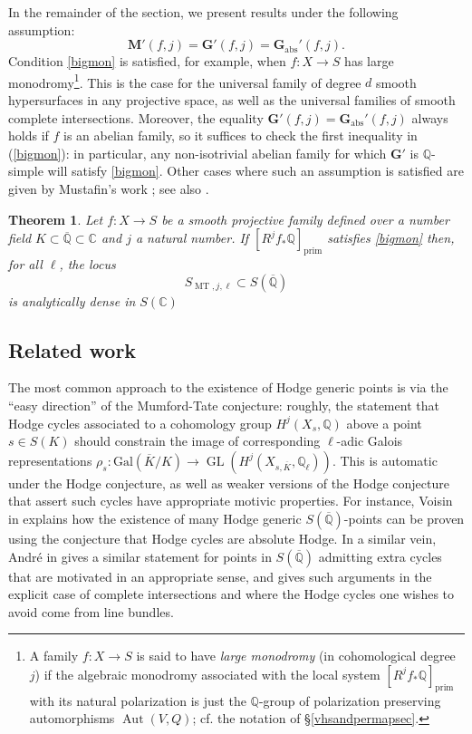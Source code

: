 \documentclass[10pt]{article}
\numberwithin{equation}{section}
\theoremstyle{plain}
\newtheorem{thm}{Theorem}[section]
\theoremstyle{definition}
\theoremstyle{remark}
\newcommand{\GL}{\operatorname{GL}}
\newcommand{\C}{\mathbb{C}}
\newcommand{\Qbar}{\overline{\mathbb{Q}}}
\newcommand{\Q}{\mathbb{Q}}
\begin{document}
In the remainder of the section, we present results under the following assumption: 
\begin{equation}\label{bigmon}
  \mathbf{M}'(f,j) = \mathbf{G}'(f,j) = \mathbf{G}_{\mathrm{abs}}'(f,j)  .
\end{equation}
Condition \eqref{bigmon} is satisfied, for example, when $f:X \to S$ has large monodromy\footnote{A family $f:X \to S$ is said to have \emph{large monodromy} (in cohomological degree $j$) if the algebraic monodromy associated with the local system $[R^{j} f_* \Q]_{\operatorname{prim}}$ with its natural polarization is just the $\mathbb{Q}$-group of polarization preserving automorphisms $\operatorname{Aut}(V,Q)$; cf. the notation of \S\ref{vhsandpermapsec}.}. This is the case for the universal family of degree $d$ smooth hypersurfaces in any projective space, as well as the universal families of smooth complete intersections. Moreover, the equality $\mathbf{G}'(f,j) = \mathbf{G}_{\mathrm{abs}}'(f,j)$ always holds if $f$ is an abelian family, so it suffices to check the first inequality in (\ref{bigmon}): in particular, any non-isotrivial abelian family for which $\mathbf{G}'$ is $\mathbb{Q}$-simple will satisfy \eqref{bigmon}. Other cases where such an assumption is satisfied are given by Mustafin's work \cite{zbMATH04029733}; see also \cite[Ch. IX 3.2]{zbMATH00041964}.


\begin{thm}\label{mainthmonMT}
Let $f : X \to S$ be a smooth projective family defined over a number field $K \subset \Qbar \subset \mathbb{C}$ and $j$ a natural number. If $[R^jf_*\Q]_{\operatorname{prim}}$ satisfies \eqref{bigmon} then, for all $\ell$, the locus
$$S_{\operatorname{MT}, j,\ell}\subset S(\Qbar)$$
is analytically dense in $S(\C)$
\end{thm}



\subsection{Related work}
\label{relworksec}


The most common approach to the existence of Hodge generic points is via the ``easy direction'' of the Mumford-Tate conjecture: roughly, the statement that Hodge cycles associated to a cohomology group $H^{j}(X_{s}, \mathbb{Q})$ above a point $s \in S(K)$ should constrain the image of corresponding $\ell$-adic Galois representations $\rho_{s} : \textrm{Gal}(\overline{K}/K) \to \GL(H^{j}(X_{s,\overline{K}}, \mathbb{Q}_{\ell}))$. This is automatic under the Hodge conjecture, as well as weaker versions of the Hodge conjecture that assert such cycles have appropriate motivic properties. For instance, Voisin in \cite[Thm. 1.11]{zbMATH06492665} explains how the existence of many Hodge generic $S(\Qbar)$-points can be proven using the conjecture that Hodge cycles are absolute Hodge. In a similar vein, Andr\'e in \cite[Thm 5.2(3)]{zbMATH01019346} gives a similar statement for points in $S(\Qbar)$ admitting extra cycles that are motivated in an appropriate sense, and \cite[Thm. 1]{zbMATH03927068} gives such arguments in the explicit case of complete intersections and where the Hodge cycles one wishes to avoid come from line bundles.
\end{document}
